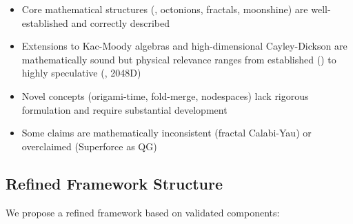 \begin{itemize}
    \item[\textcolor{validcolor}{\textbf{Valid}}] Core mathematical structures (, octonions, fractals, moonshine) are well-established and correctly described

    \item[\textcolor{orange}{\textbf{Partial}}] Extensions to Kac-Moody algebras and high-dimensional Cayley-Dickson are mathematically sound but physical relevance ranges from established () to highly speculative (, 2048D)

    \item[\textcolor{claimcolor}{\textbf{Speculative}}] Novel concepts (origami-time, fold-merge, nodespaces) lack rigorous formulation and require substantial development

    \item[\textcolor{red}{\textbf{Problematic}}] Some claims are mathematically inconsistent (fractal Calabi-Yau) or overclaimed (Superforce as QG)
\end{itemize}

\subsection{Refined Framework Structure}

We propose a refined framework based on validated components:

